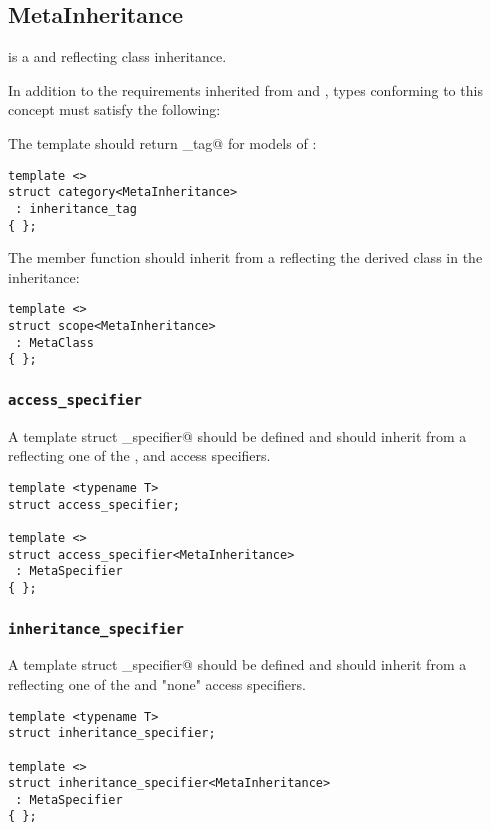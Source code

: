 \subsection{MetaInheritance}
\label{concept-MetaInheritance}

 is a  and  reflecting class inheritance.

In addition to the requirements inherited from  and ,
types conforming to this concept must satisfy the following:

The \verb@category@ template should return \verb@inheritance_tag@ for models
of :

\begin{verbatim}
template <>
struct category<MetaInheritance>
 : inheritance_tag
{ };
\end{verbatim}

The \verb@scope@ member function should inherit from a  reflecting
the derived class in the inheritance:

\begin{verbatim}
template <>
struct scope<MetaInheritance>
 : MetaClass
{ };
\end{verbatim}

\subsubsection{\texttt{access\_specifier}}

A template struct \verb@access_specifier@ should be defined and should inherit from
a  reflecting one of the \verb@private@, \verb@protected@ and
\verb@public@ access specifiers.

\begin{verbatim}
template <typename T>
struct access_specifier;

template <>
struct access_specifier<MetaInheritance>
 : MetaSpecifier
{ };
\end{verbatim}

\subsubsection{\texttt{inheritance\_specifier}}

A template struct \verb@inheritance_specifier@ should be defined and should inherit from
a  reflecting one of the \verb@virtual@ and "none" access specifiers.

\begin{verbatim}
template <typename T>
struct inheritance_specifier;

template <>
struct inheritance_specifier<MetaInheritance>
 : MetaSpecifier
{ };
\end{verbatim}

